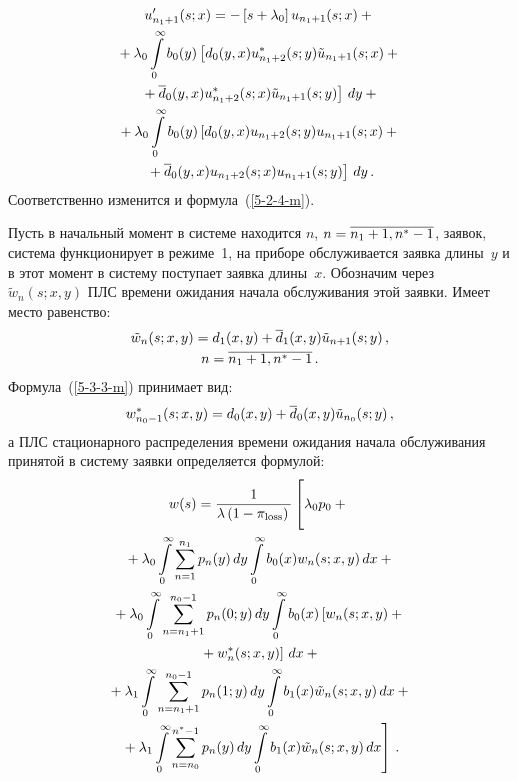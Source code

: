 \begin{multicols}{2}
\vspace*{-24pt}

\noindent
\begin{multline*}
u'_{n_1+1}(s;x) = - \left[s + \lambda_0\right] u_{n_1+1}(s;x) +{}
\\
{}+
\lambda_0 \int\limits_0^\infty b_0(y) \left[d_0(y,x) u^*_{n_1+2}(s;y) \tilde{u}_{n_1+1}(s;x)
+ {}\right.\\
\left.{}+\overline d_0(y,x) u^*_{n_1+2}(s;x) \tilde{u}_{n_1+1}(s;y)\right] \, dy+{}
\\
{}+
\lambda_0 \int\limits_0^\infty b_0(y) \left[d_0(y,x) u_{n_1+2}(s;y) u_{n_1+1}(s;x)
+ {}\right.\\
\left.{}+\overline d_0(y,x) u_{n_1+2}(s;x) u_{n_1+1}(s;y)\right] \, dy\,.
\end{multline*}
Соответственно изменится и формула~(\ref{5-2-4-m}).

Пусть в начальный момент в системе находится
$n$, $n\hm=\overline{n_1+1,n^*-1}$, заявок, система
функционирует в режиме~1, на приборе обслуживается
заявка длины~$y$ и в этот момент в систему поступает
заявка длины~$x$.
Обозначим через $\tilde{w}_n(s;x,y)$ ПЛС времени ожидания
начала обслуживания этой заявки.
Имеет место равенство:
\begin{multline*}
\tilde{w}_n(s;x,y) = d_1(x,y) + \overline d_1(x,y) \tilde{u}_{n+1}(s;y)\,,\\ 
n=\overline{n_1+1,n^*-1}\,.
\end{multline*}
Формула~(\ref{5-3-3-m}) %
принимает вид:
\begin{equation*}
w^*_{n_0-1}(s;x,y) = d_0(x,y) + \overline d_0(x,y) \tilde{u}_{n_0}(s;y) \,,
\end{equation*}
а ПЛС стационарного распределения времени ожидания начала
обслуживания принятой в систему заявки определяется
формулой:
\begin{multline*}
w(s) = \displaystyle\frac{\displaystyle 1\mathstrut}{\displaystyle \lambda \left( 
1-\pi_{\mathrm{loss}}\right)\mathstrut}
\left[ \vphantom{\int\limits_0^\infty}
\lambda_0 p_0 + {}\right.\\
{}+\lambda_0 \int\limits_0^\infty \sum\limits_{n=1}^{n_1}
p_n(y) \, dy \int\limits_0^\infty b_0(x) w_n(s;x,y) \, dx +{}
\\
{}+
\lambda_0 \int\limits_0^\infty \sum\limits_{n=n_1+1}^{n_0-1} p_n(0;y) \, dy
\int\limits_0^\infty b_0(x) \left[w_n(s;x,y) +{}\right.\\
\left.{}+ w^*_n(s;x,y)
\right]
\, dx +{}\\
{}+ \lambda_1 \int\limits_0^\infty \sum\limits_{n=n_1+1}^{n_0-1}
p_n(1;y) \, dy \int\limits_0^\infty b_1(x) \tilde{w}_n(s;x,y) \, dx +{}\\
\left.{}+
\lambda_1 \int\limits_0^\infty \sum\limits_{n=n_0}^{n^*-1} p_n(y) \, dy
\int\limits_0^\infty b_1(x) \tilde{w}_n(s;x,y) \, dx\right]\,.
\end{multline*}



\end{multicols}
